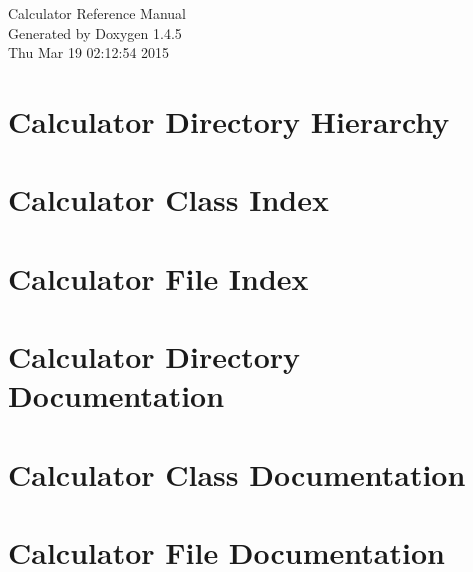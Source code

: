 \documentclass[a4paper]{book}
\begin{document}
\begin{titlepage}
\vspace*{7cm}
\begin{center}
{\Large Calculator Reference Manual}\\
\vspace*{1cm}
{\large Generated by Doxygen 1.4.5}\\
\vspace*{0.5cm}
{\small Thu Mar 19 02:12:54 2015}\\
\end{center}
\end{titlepage}
\clearemptydoublepage
{}
\tableofcontents
\clearemptydoublepage
{}
\chapter{Calculator Directory Hierarchy}

\chapter{Calculator Class Index}

\chapter{Calculator File Index}

\chapter{Calculator Directory Documentation}





\chapter{Calculator Class Documentation}





\chapter{Calculator File Documentation}

\printindex
\end{document}
